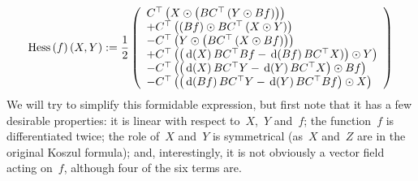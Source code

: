 \begin{equation*}
	\mathrm{Hess}\left(f\right)(X,Y) :=
	\frac12\left(
		\begin{array}{l}
		C^\top\left(X\odot\left(BC^\top\left(Y\odot Bf\right)\right)\right)
		\\
		+
		C^\top\left(\left( Bf \right)\odot BC^\top\left(X\odot Y\right)\right)
		\\
		-
		C^\top\left(Y\odot\left(BC^\top\left(X\odot Bf\right)\right)\right)
		\\
		+
		C^\top\left(\left(
				\,\mathrm{d}\!\left(X\right)BC^\top Bf-\,\mathrm{d}\!\left(Bf\right)BC^\top X
		) \right)\odot Y\right)
		\\
		-
		C^\top\left(
			\left(
				\,\mathrm{d}\!\left(X\right)BC^\top Y-\,\mathrm{d}\!\left(Y\right)BC^\top X
			\right)
			\odot Bf\right)
		\\
		-
		C^\top\left(
			\left(
				\,\mathrm{d}\!\left(Bf\right)BC^\top Y-\,\mathrm{d}\!\left(Y\right)BC^\top Bf
			\right)
		\odot X \right)
		\end{array}
	\right)
\end{equation*}
We will try to simplify this formidable expression, but first note that it
has a few desirable properties:  it is linear with respect to~$X$,~$Y$
and~$f$; the function~$f$ is differentiated twice; the role of~$X$ and~$Y$ is
symmetrical (as~$X$ and~$Z$ are in the original Koszul formula); and,
interestingly, it is not obviously a vector field acting on~$f$, although
four of the six terms are.

